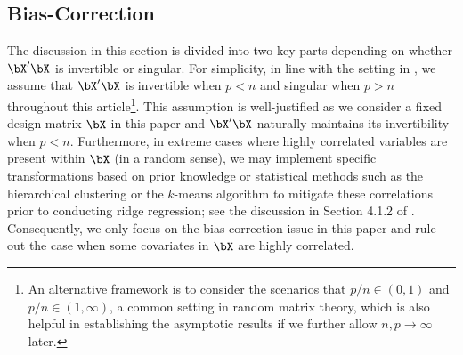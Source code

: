 \subsection{Bias-Correction}\label{sec23}
The discussion in this section is divided into two key parts depending on whether $\bX'\bX$ is invertible or singular. For simplicity, in line with the setting  in \cite{wang2016high}, we assume that $\bX'\bX$ is invertible when $p< n$ and singular when $p>n$ throughout this article\footnote{An alternative framework is to consider the scenarios that $p/n\in (0,1)$ and $p/n\in(1,\infty)$, a common setting in random matrix theory, which is also helpful in establishing the asymptotic results if we further allow $n,p\rightarrow\infty$ later.}. This assumption is well-justified as we consider a fixed design matrix $\bX$ in this paper and  $\bX'\bX$ naturally maintains its invertibility when $p< n$. Furthermore, in extreme cases where highly correlated variables are present within $\bX$ (in a random sense), we may implement specific transformations based on prior knowledge or statistical methods such as the hierarchical clustering or the $k$-means algorithm to mitigate these correlations prior to conducting ridge regression; see the discussion in Section 4.1.2 of \cite{fan2008sure}. Consequently, we only focus on the bias-correction issue in this paper and rule out the case when some covariates in $\bX$ are highly correlated.







